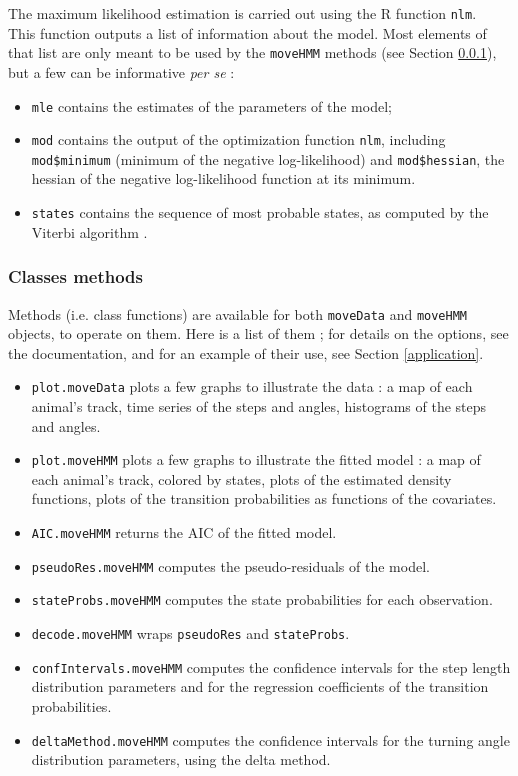 \documentclass[]{article}
\begin{document}
The maximum likelihood estimation is carried out using the R function \texttt{nlm}.\\

This function outputs a list of information about the model. Most elements of that list are only meant to be used by the \texttt{moveHMM} methods (see Section \ref{methods}), but a few can be informative \textit{per se} :
\begin{itemize}
	\item \texttt{mle} contains the estimates of the parameters of the model;
	\item \texttt{mod} contains the output of the optimization function \texttt{nlm}, including \texttt{mod\$minimum} (minimum of the negative log-likelihood) and \texttt{mod\$hessian}, the hessian of the negative log-likelihood function at its minimum.
	\item \texttt{states} contains the sequence of most probable states, as computed by the Viterbi algorithm \citep{zucchini2009}.
\end{itemize}

\subsubsection{Classes methods} \label{methods}
Methods (i.e. class functions) are available for both \texttt{moveData} and \texttt{moveHMM} objects, to operate on them. Here is a list of them ; for details on the options, see the documentation, and for an example of their use, see Section \ref{application}.

\begin{itemize}
	\item \texttt{plot.moveData} plots a few graphs to illustrate the data : a map of each animal's track, time series of the steps and angles, histograms of the steps and angles.
	\item \texttt{plot.moveHMM} plots a few graphs to illustrate the fitted model : a map of each animal's track, colored by states, plots of the estimated density functions, plots of the transition probabilities as functions of the covariates.
	\item \texttt{AIC.moveHMM} returns the AIC of the fitted model.
	\item \texttt{pseudoRes.moveHMM} computes the pseudo-residuals of the model.
	\item \texttt{stateProbs.moveHMM} computes the state probabilities for each observation.
	\item \texttt{decode.moveHMM} wraps \texttt{pseudoRes} and \texttt{stateProbs}.
	\item \texttt{confIntervals.moveHMM} computes the confidence intervals for the step length distribution parameters and for the regression coefficients of the transition probabilities.
	\item \texttt{deltaMethod.moveHMM} computes the confidence intervals for the turning angle distribution parameters, using the delta method.
\end{itemize} 
\end{document}
